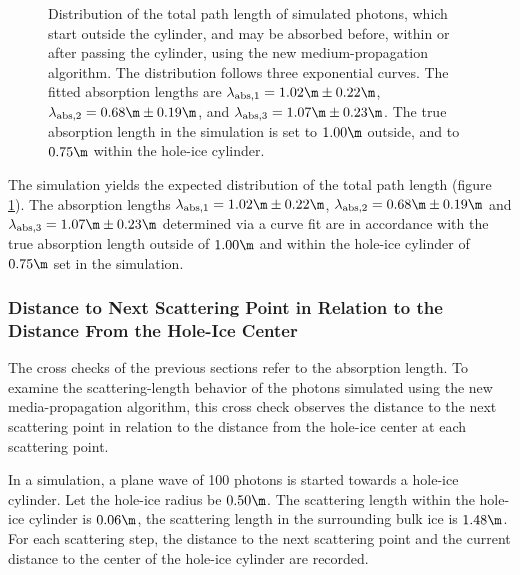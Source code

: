 \begin{figure}[htbp]
  \caption{Distribution of the total path length of simulated photons, which start outside the cylinder, and may be absorbed before, within or after passing the cylinder, using the new medium-propagation algorithm. The distribution follows three exponential curves. The fitted absorption lengths are $\lambda_\text{abs,1} = 1.02\m \pm 0.22\m$, $\lambda_\text{abs,2} = 0.68\m \pm 0.19\m$, and $\lambda_\text{abs,3} = 1.07\m \pm 0.23\m$. The true absorption length in the simulation is set to $1.00\m$ outside, and to $0.75\m$ within the hole-ice cylinder.}
  \label{fig:io9eiDee}
\end{figure}

The simulation yields the expected distribution of the total path length (figure \ref{fig:io9eiDee}). The absorption lengths $\lambda_\text{abs,1} = 1.02\m \pm 0.22\m$, $\lambda_\text{abs,2} = 0.68\m \pm 0.19\m$ and $\lambda_\text{abs,3} = 1.07\m \pm 0.23\m$ determined via a curve fit are in accordance with the true absorption length outside of $1.00\m$ and within the hole-ice cylinder of $0.75\m$ set in the simulation.


\FloatBarrier
\subsubsection{Distance to Next Scattering Point in Relation to the Distance From the Hole-Ice Center}
\label{sec:cross_check_71}


The cross checks of the previous sections refer to the absorption length. To examine the scattering-length behavior of the photons simulated using the new media-propagation algorithm, this cross check observes the distance to the next scattering point in relation to the distance from the hole-ice center at each scattering point.

In a simulation, a plane wave of 100 photons is started towards a hole-ice cylinder. Let the hole-ice radius be $0.50\m$. The scattering length within the hole-ice cylinder is $0.06\m$, the scattering length in the surrounding bulk ice is $1.48\m$.
For each scattering step, the distance to the next scattering point and the current distance to the center of the hole-ice cylinder are recorded.


